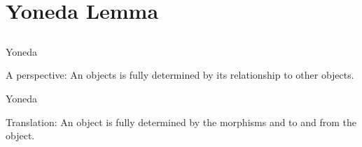 \documentclass[tikz]{beamer}
\theoremstyle{definition}
\begin{document}
\section{Yoneda Lemma}
\subsection{}
\begin{frame}{Yoneda}
    
\begin{block}{A perspective:}
    An objects is fully determined by its relationship to other objects.
\end{block}{}


\end{frame}

\begin{frame}{Yoneda}
    
    
\begin{block}{Translation:}
    An object is fully determined by the morphisms and to and from the object.
\end{block}{}

\end{frame}
\end{document}
